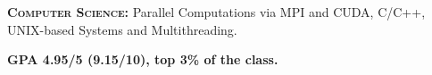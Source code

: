 \begin{cventries}
{\begin{cvitems}
        \item {\textsc{\textbf{Computer Science:}}\hspace{5pt} Parallel Computations via \textsf{MPI and CUDA}, \hspace{5pt}  C/C++, \hspace{5pt} UNIX-based Systems and Multithreading.}
		\item {\textbf{GPA 4.95/5 (9.15/10), top 3\% of the class.}}        
      \end{cvitems}
    }

\end{cventries}
